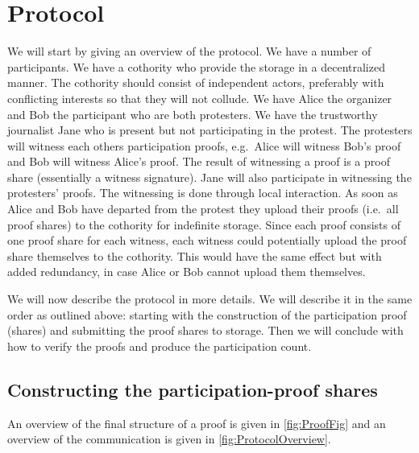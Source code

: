 \section{Protocol}

We will start by giving an overview of the protocol.
We have a number of participants.
We have a cothority who provide the storage in a decentralized manner.
The cothority should consist of independent actors, preferably with conflicting 
interests so that they will not collude.
We have Alice the organizer and Bob the participant who are both protesters.
We have the trustworthy journalist Jane who is present but not participating in 
the protest.
The protesters will witness each others participation proofs, e.g.\ Alice will 
witness Bob's proof and Bob will witness Alice's proof.
The result of witnessing a proof is a proof share (essentially a witness 
signature).
Jane will also participate in witnessing the protesters' proofs.
The witnessing is done through local interaction.
As soon as Alice and Bob have departed from the protest they upload their proofs 
(i.e.\ all proof shares) to the cothority for indefinite storage.
Since each proof consists of one proof share for each witness, each witness 
could potentially upload the proof share themselves to the cothority.
This would have the same effect but with added redundancy, in case Alice or Bob 
cannot upload them themselves.

We will now describe the protocol in more details.
We will describe it in the same order as outlined above:
starting with the construction of the participation proof (shares) and 
submitting the proof shares to storage.
Then we will conclude with how to verify the proofs and produce the 
participation count.

\subsection{Constructing the participation-proof shares}

An overview of the final structure of a proof is given in \cref{fig:ProofFig} 
and an overview of the communication is given in \cref{fig:ProtocolOverview}.

